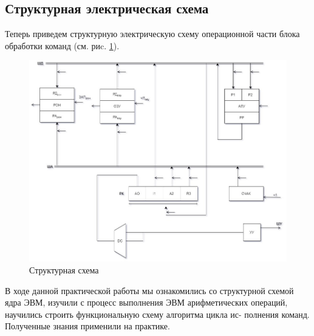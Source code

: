 \documentclass[a4paper,14pt]{extarticle}
\begin{document}
\subsection{Структурная электрическая схема}
Теперь приведем структурную электрическую схему операционной части блока обработки команд (см. риc. \ref{fig:unit}).
\begin{figure}[htpb]
	\centering
	\includegraphics[width=0.6\linewidth]{images/unit}
	\caption{Структурная схема}
	\label{fig:unit}
\end{figure}


В ходе данной практической работы мы ознакомились со структурной
схемой ядра ЭВМ, изучили с процесс выполнения ЭВМ арифметических
операций, научились строить функциональную схему алгоритма цикла ис-
полнения команд. Полученные знания применили на практике.
\end{document}
